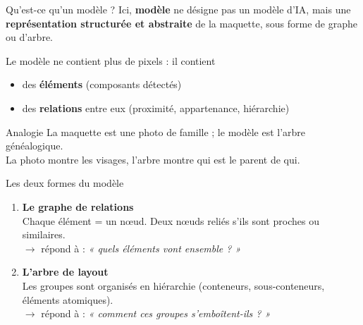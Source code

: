 \documentclass[11pt,aspectratio=169]{beamer}
\begin{document}
\begin{frame}{Qu'est-ce qu'un modèle ?}
Ici, \textbf{modèle} ne désigne pas un modèle d'IA, mais une \textbf{représentation structurée et abstraite} de la maquette, sous forme de graphe ou d'arbre.

\vspace{0.3cm}
Le modèle ne contient plus de pixels : il contient
\begin{itemize}
    \item des \textbf{éléments} (composants détectés)
    \item des \textbf{relations} entre eux (proximité, appartenance, hiérarchie)
\end{itemize}

\vspace{0.3cm}
\begin{block}{Analogie}
La maquette est une photo de famille ; le modèle est l'arbre généalogique.\\
La photo montre les visages, l'arbre montre qui est le parent de qui.
\end{block}
\end{frame}

\begin{frame}{Les deux formes du modèle}
\begin{enumerate}
    \item \textbf{Le graphe de relations}\\
    Chaque élément = un n\oe{}ud. Deux n\oe{}uds reliés s'ils sont proches ou similaires.\\
    $\to$ répond à : \emph{« quels éléments vont ensemble ? »}
    \vspace{0.3cm}
    \item \textbf{L'arbre de layout}\\
    Les groupes sont organisés en hiérarchie (conteneurs, sous-conteneurs, éléments atomiques).\\
    $\to$ répond à : \emph{« comment ces groupes s'emboîtent-ils ? »}
\end{enumerate}
\end{frame}
\end{document}
